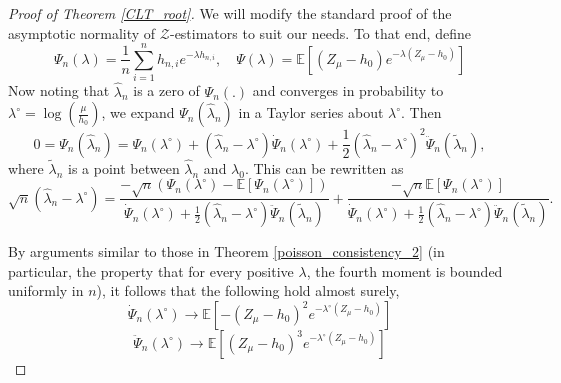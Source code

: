 \documentclass[12pt]{article}
\numberwithin{equation}{section}
\begin{document}
\begin{proof}[Proof of Theorem \ref{CLT_root}]
   We will modify the standard proof of the asymptotic normality of \(\mathcal{Z}\)-estimators to suit our needs. To that end, define
\[
\Psi_n(\lambda) = \frac{1}{n}\sum_{i=1}^n h_{n,i} e^{-\lambda h_{n,i}}  , 
\quad \Psi(\lambda) = \mathbb{E}\left[(Z_{\mu}-h_0)e^{-\lambda(Z_{\mu}-h_0)}\right]
\]
Now noting that \(\hat{\lambda}_n\) is a zero of \(\Psi_n(.)\) and converges in probability to \(\lambda^{\circ} = \log(\frac{\mu}{h_0})\), we expand \(\Psi_n(\hat{\lambda}_n)\) in a Taylor series about \(\lambda^{\circ}\). Then
\[
0 = \Psi_n(\hat{\lambda}_n) = \Psi_n(\lambda^{\circ}) + (\hat{\lambda}_n - \lambda^{\circ}) \dot{\Psi}_n(\lambda^{\circ}) 
+ \frac{1}{2} (\hat{\lambda}_n - \lambda^{\circ})^2 \ddot{\Psi}_n(\tilde{\lambda}_n),
\]
where $\tilde{\lambda}_n$ is a point between $\hat{\lambda}_n$ and $\lambda_0$. This can be rewritten as
\begin{equation}
\sqrt{n} (\hat{\lambda}_n - \lambda^{\circ}) = 
\frac{- \sqrt{n} (\Psi_n(\lambda^{\circ}) - \mathbb{E}[\Psi_n(\lambda^{\circ})])}{\dot{\Psi}_n(\lambda^{\circ}) + \frac{1}{2} (\hat{\lambda}_n - \lambda^{\circ}) \ddot{\Psi}_n(\tilde{\lambda}_n)} + \frac{-\sqrt{n}\mathbb{E}[\Psi_n(\lambda^{\circ})]}{\dot{\Psi}_n(\lambda^{\circ}) + \frac{1}{2} (\hat{\lambda}_n - \lambda^{\circ}) \ddot{\Psi}_n(\tilde{\lambda}_n)}.
\label{Z_Taylor}
\end{equation}


By arguments similar to those in Theorem \ref{poisson_consistency_2} (in particular, the property that for every positive \(\lambda\), the fourth moment is bounded uniformly in \(n\)), it follows that the following hold almost surely,
\[\dot{\Psi}_n(\lambda^{\circ}) \to \mathbb{E}\left[-(Z_{\mu}-h_0)^2e^{-\lambda^{\circ}(Z_{\mu}-h_0)}\right]\]
\[\ddot{\Psi}_n(\lambda^{\circ}) \to \mathbb{E}\left[(Z_{\mu}-h_0)^3e^{-\lambda^{\circ}(Z_{\mu}-h_0)}\right]\]


\end{proof}
\end{document}

